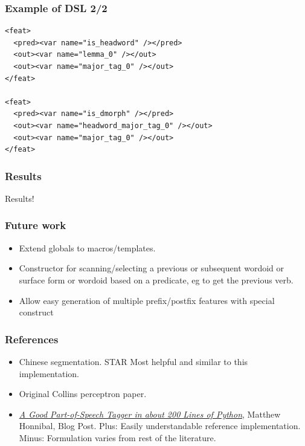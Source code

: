 \documentclass{beamer}
\begin{document}
\begin{frame}[fragile]
\frametitle{Example of DSL 2/2}
{\scriptsize
\begin{verbatim}
<feat>
  <pred><var name="is_headword" /></pred>
  <out><var name="lemma_0" /></out>
  <out><var name="major_tag_0" /></out>
</feat>

<feat>
  <pred><var name="is_dmorph" /></pred>
  <out><var name="headword_major_tag_0" /></out>
  <out><var name="major_tag_0" /></out>
</feat>
\end{verbatim}
}

\end{frame}

\begin{frame}
\frametitle{Results}
Results!
\end{frame}

\begin{frame}
\frametitle{Future work}
\begin{itemize}

  \item Extend globals to macros/templates.

  \item Constructor for scanning/selecting a previous or subsequent wordoid or
    surface form or wordoid based on a predicate, eg to get the previous verb.

  \item Allow easy generation of multiple prefix/postfix features with special
    construct

\end{itemize}
\end{frame}

\begin{frame}
\frametitle{References}
\begin{itemize}

  \item Chinese segmentation. STAR Most helpful and similar to this implementation.

  \item Original Collins perceptron paper.

  \item \textit{\href{https://spacy.io/blog/part-of-speech-pos-tagger-in-python}{A Good Part-of-Speech Tagger in about 200 Lines of Python}},
    Matthew Honnibal, Blog Post.
    Plus: Easily understandable reference implementation. Minus: Formulation
    varies from rest of the literature.

\end{itemize}
\end{frame}
\end{document}
